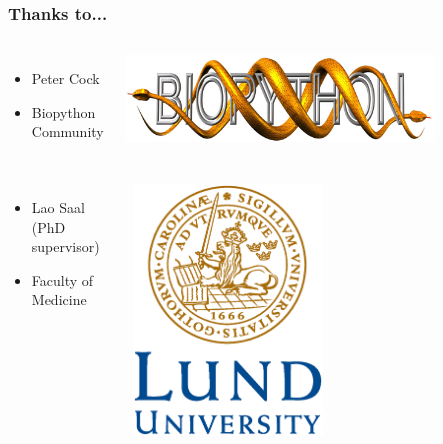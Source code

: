 \documentclass[trans]{beamer}
\begin{document}
\frame
{
  \frametitle{Thanks to...}

  \begin{minipage}{1\textwidth}
  \begin{columns}
  \begin{itemize}
  \item Peter Cock
  \item Biopython Community
  \end{itemize}
  \includegraphics[width=0.8\textwidth]{../abstract/biopython.jpg}
  \end{columns}
  \end{minipage}

  \vspace{1cm}

  \begin{minipage}{1\textwidth}
  \begin{columns}
  \begin{itemize}
  \item Lao Saal (PhD supervisor)
  \item Faculty of Medicine
  \end{itemize}
  \includegraphics[width=0.5\textwidth]{LundUniversity_C2line_PMS.eps}
  \end{columns}
  \end{minipage}
}
\end{document}

